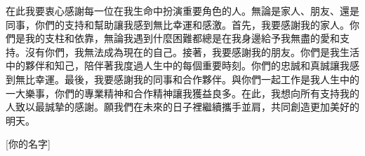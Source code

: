 在此我要衷心感謝每一位在我生命中扮演重要角色的人。無論是家人、朋友、還是同事，你們的支持和幫助讓我感到無比幸運和感激。首先，我要感謝我的家人。你們是我的支柱和依靠，無論我遇到什麼困難都總是在我身邊給予我無盡的愛和支持。沒有你們，我無法成為現在的自己。接著，我要感謝我的朋友。你們是我生活中的夥伴和知己，陪伴著我度過人生中的每個重要時刻。你們的忠誠和真誠讓我感到無比幸運。最後，我要感謝我的同事和合作夥伴。與你們一起工作是我人生中的一大樂事，你們的專業精神和合作精神讓我獲益良多。在此，我想向所有支持我的人致以最誠摯的感謝。願我們在未來的日子裡繼續攜手並肩，共同創造更加美好的明天。

\hfill[你的名字]